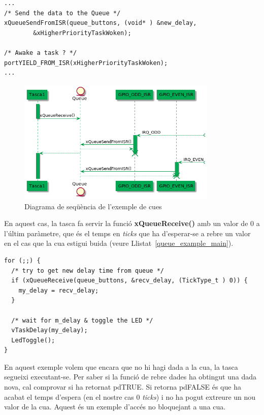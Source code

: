 \begin{lstlisting}[style=customc, label=Queue_example_ISR, caption=Part del codi d'una de les ISRs]
...
/* Send the data to the Queue */
xQueueSendFromISR(queue_buttons, (void* ) &new_delay,
		&xHigherPriorityTaskWoken);

/* Awake a task ? */
portYIELD_FROM_ISR(xHigherPriorityTaskWoken);
...
\end{lstlisting}


\begin{figure}
 \centering
 \includegraphics[width=0.85\textwidth, keepaspectratio]{imatges/QueueFreeRTOS.png}
 \caption{Diagrama de seqüència de l'exemple de cues}
 \label{fig:SeqDiagramQueue}
\end{figure}

En aquest cas, la tasca fa servir la funció {\bf xQueueReceive()} amb un valor de 0 a l'últim paràmetre, que és el temps en {\em ticks} que ha d'esperar-se a rebre un valor en el cas que la cua estigui buida (veure Llistat~\ref{queue_example_main}).

\begin{lstlisting}[style=customc,label=queue_example_main, caption=Part principal de la tasca TaskLedToggle]
for (;;) {
  /* try to get new delay time from queue */
  if (xQueueReceive(queue_buttons, &recv_delay, (TickType_t ) 0)) {
    my_delay = recv_delay;
  }

  /* wait for m_delay & toggle the LED */
  vTaskDelay(my_delay);
  LedToggle();
}
\end{lstlisting}

En aquest exemple volem que encara que no hi hagi dada a la cua, la tasca segueixi executant-se. Per saber si la funció de rebre dades ha obtingut una dada nova, cal comprovar si ha retornat \gls{pdTRUE}. Si retorna \gls{pdFALSE} és que ha acabat el temps d'espera (en el nostre cas 0 {\em ticks}) i no ha pogut extreure un nou valor de la cua. Aquest és un exemple d'accés no bloquejant a una cua.

